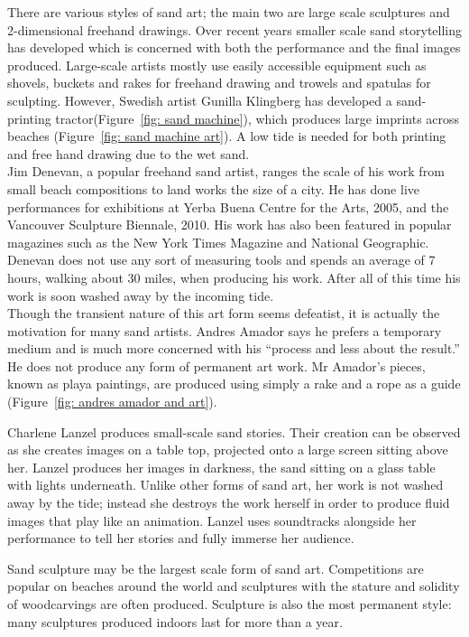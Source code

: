         There are various styles of sand art; the main two are large scale sculptures and 2-dimensional freehand drawings. Over recent years smaller scale sand storytelling has developed which is concerned with both the performance and the final images produced. Large-scale artists mostly use easily accessible equipment such as shovels, buckets and rakes for freehand drawing and trowels and spatulas for sculpting. However, Swedish artist Gunilla Klingberg has developed a sand-printing tractor(Figure~\ref{fig: sand machine}), which produces large imprints across beaches (Figure~\ref{fig: sand machine art}). A low tide is needed for both printing and free hand drawing due to the wet sand.\\
        Jim Denevan, a popular freehand sand artist, ranges the scale of his work from small beach compositions to land works the size of a city. He has done live performances for exhibitions at Yerba Buena Centre for the Arts, 2005, and the Vancouver Sculpture Biennale, 2010. His work has also been featured in popular magazines such as the New York Times Magazine and National Geographic. Denevan does not use any sort of measuring tools and spends an average of 7 hours, walking about 30 miles, when producing his work. After all of this time his work is soon washed away by the incoming tide.\\
        Though the transient nature of this art form seems defeatist, it is actually the motivation for many sand artists. Andres Amador says he prefers a temporary medium and is much more concerned with his ``process and less about the result.'' He does not produce any form of permanent art work. Mr Amador's pieces, known as playa paintings, are produced using simply a rake and a rope as a guide (Figure~\ref{fig: andres amador and art}).

        Charlene Lanzel produces small-scale sand stories. Their creation can be observed as she creates images on a table top, projected onto a large screen sitting above her. Lanzel produces her images in darkness, the sand sitting on a glass table with lights underneath. Unlike other forms of sand art, her work is not washed away by the tide; instead she destroys the work herself in order to produce fluid images that play like an animation. Lanzel uses soundtracks alongside her performance to tell her stories and fully immerse her audience.

        Sand sculpture may be the largest scale form of sand art. Competitions are popular on beaches around the world and sculptures with the stature and solidity of woodcarvings are often produced.  Sculpture is also the most permanent style: many sculptures produced indoors last for more than a year.

